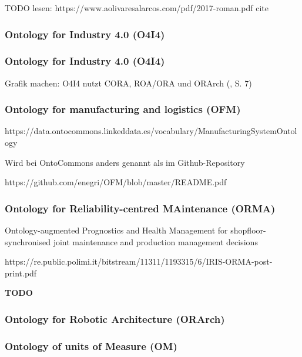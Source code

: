\documentclass{article}
\begin{document}
TODO lesen: https://www.aolivaresalarcos.com/pdf/2017-roman.pdf
cite \cite{olszewska2017ontology}

\subsubsection{Ontology for Industry 4.0 (O4I4)}

\cite{kumar2019ontologies}

\subsubsection{Ontology for Industry 4.0 (O4I4)}

\cite{kumar2019ontologies}

Grafik machen: O4I4 nutzt CORA, ROA/ORA und ORArch (\cite{kumar2019ontologies}, S. 7)

\subsubsection{Ontology for manufacturing and logistics (OFM)}

https://data.ontocommons.linkeddata.es/vocabulary/ManufacturingSystemOntology

Wird bei OntoCommons anders genannt als im Github-Repository

https://github.com/enegri/OFM/blob/master/README.pdf

\subsubsection{Ontology for Reliability-centred MAintenance (ORMA)}

Ontology-augmented Prognostics and Health Management for shopfloor-synchronised joint
maintenance and production management decisions

https://re.public.polimi.it/bitstream/11311/1193315/6/IRIS-ORMA-post-print.pdf

\textbf{TODO}

\subsubsection{Ontology for Robotic Architecture (ORArch)}

\cite{kumar2019ontologies}

\subsubsection{Ontology of units of Measure (OM)}
\end{document}
